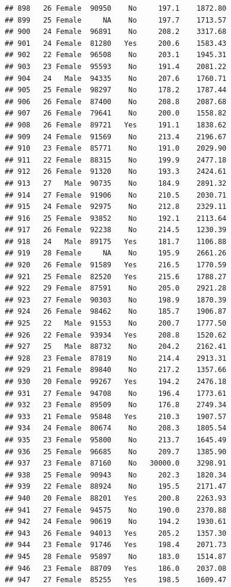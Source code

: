 \documentclass[12pt,]{krantz}
\theoremstyle{definition}
\theoremstyle{definition}
\theoremstyle{remark}
\begin{document}
\begin{verbatim}
## 898   26 Female  90950    No     197.1    1872.80
## 899   25 Female     NA    No     197.7    1713.57
## 900   24 Female  96891    No     208.2    3317.68
## 901   24 Female  81280   Yes     200.6    1583.43
## 902   22 Female  96508    No     203.1    1945.31
## 903   23 Female  95593    No     191.4    2081.22
## 904   24   Male  94335    No     207.6    1760.71
## 905   25 Female  98297    No     178.2    1787.44
## 906   26 Female  87400    No     208.8    2087.68
## 907   26 Female  79641    No     200.0    1558.82
## 908   26 Female  89721   Yes     191.1    1838.62
## 909   24 Female  91569    No     213.4    2196.67
## 910   23 Female  85771    No     191.0    2029.90
## 911   22 Female  88315    No     199.9    2477.18
## 912   26 Female  91320    No     193.3    2424.61
## 913   27   Male  90735    No     184.9    2891.32
## 914   27 Female  91906    No     210.5    2030.71
## 915   24 Female  92975    No     212.8    2329.11
## 916   25 Female  93852    No     192.1    2113.64
## 917   26 Female  92238    No     214.5    1230.39
## 918   24   Male  89175   Yes     181.7    1106.88
## 919   28 Female     NA    No     195.9    2661.26
## 920   26 Female  91589   Yes     216.5    1770.59
## 921   25 Female  82520   Yes     215.6    1788.27
## 922   29 Female  87591    No     205.0    2921.28
## 923   27 Female  90303    No     198.9    1870.39
## 924   26 Female  98462    No     185.7    1906.87
## 925   22   Male  91553    No     200.7    1777.50
## 926   22 Female  93934   Yes     208.8    1520.62
## 927   25   Male  88732    No     204.2    2162.41
## 928   23 Female  87819    No     214.4    2913.31
## 929   21 Female  89840    No     217.2    1357.66
## 930   20 Female  99267   Yes     194.2    2476.18
## 931   27 Female  94708    No     196.4    1773.61
## 932   23 Female  89509    No     176.8    2749.34
## 933   21 Female  95848   Yes     210.3    1907.57
## 934   24 Female  80674    No     208.3    1805.54
## 935   23 Female  95800    No     213.7    1645.49
## 936   25 Female  96685    No     209.7    1385.90
## 937   23 Female  87160    No   30000.0    3298.91
## 938   25 Female  90943    No     202.3    1820.34
## 939   22 Female  88924    No     195.5    2171.47
## 940   20 Female  88201   Yes     200.8    2263.93
## 941   27 Female  94575    No     190.0    2370.88
## 942   24 Female  90619    No     194.2    1930.61
## 943   26 Female  94013   Yes     205.2    1357.30
## 944   23 Female  91746   Yes     198.4    2071.73
## 945   28 Female  95897    No     183.0    1514.87
## 946   23 Female  88709   Yes     186.0    2037.08
## 947   27 Female  85255   Yes     198.5    1609.47

\end{verbatim}
\end{document}
